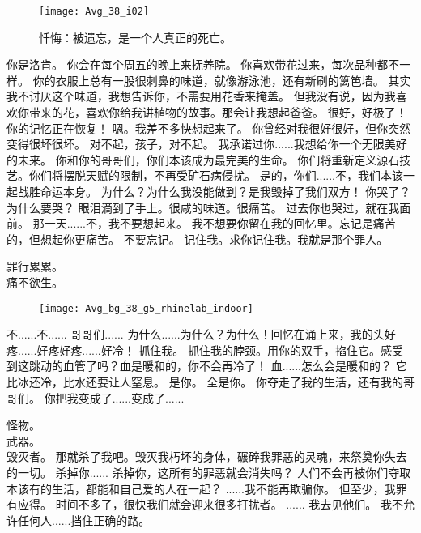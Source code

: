 \documentclass[openany]{book}
\begin{document}
\begin{figure}[h]
    \caption*{忏悔：被遗忘，是一个人真正的死亡。}
    \centering
    \texttt{[image: Avg\_38\_i02]}
\end{figure}
\begin{dialogue}
     你是洛肯。
     你会在每个周五的晚上来抚养院。
     你喜欢带花过来，每次品种都不一样。
     你的衣服上总有一股很刺鼻的味道，就像游泳池，还有新刷的篱笆墙。
     其实我不讨厌这个味道，我想告诉你，不需要用花香来掩盖。
     但我没有说，因为我喜欢你带来的花，喜欢你给我讲植物的故事。那会让我想起爸爸。
     很好，好极了！你的记忆正在恢复！
     嗯。我差不多快想起来了。
     你曾经对我很好很好，但你突然变得很坏很坏。
     对不起，孩子，对不起。
     我承诺过你......我想给你一个无限美好的未来。
     你和你的哥哥们，你们本该成为最完美的生命。
     你们将重新定义源石技艺。你们将摆脱天赋的限制，不再受矿石病侵扰。
     是的，你们......不，我们本该一起战胜命运本身。
     为什么？为什么我没能做到？是我毁掉了我们双方！
     你哭了？为什么要哭？
     眼泪滴到了手上。很咸的味道。很痛苦。
     过去你也哭过，就在我面前。
     那一天......不，我不要想起来。
     我不想要你留在我的回忆里。忘记是痛苦的，但想起你更痛苦。
     不要忘记。
     记住我。求你记住我。我就是那个罪人。\par
    罪行累累。\\
    痛不欲生。
    \begin{figure}[h]
        \centering
        \texttt{[image: Avg\_bg\_38\_g5\_rhinelab\_indoor]}
    \end{figure}
     不......不......
     哥哥们......
     为什么......为什么？为什么！回忆在涌上来，我的头好疼......好疼好疼......好冷！
     抓住我。
     抓住我的脖颈。用你的双手，掐住它。感受到这跳动的血管了吗？血是暖和的，你不会再冷了！
     血......怎么会是暖和的？
     它比冰还冷，比水还要让人窒息。
     是你。
     全是你。
     你夺走了我的生活，还有我的哥哥们。
     你把我变成了......变成了......\par
    怪物。\\
    武器。\\
    毁灭者。
     那就杀了我吧。毁灭我朽坏的身体，碾碎我罪恶的灵魂，来祭奠你失去的一切。
     杀掉你......
     杀掉你，这所有的罪恶就会消失吗？
     人们不会再被你们夺取本该有的生活，都能和自己爱的人在一起？
     ......我不能再欺骗你。
     但至少，我罪有应得。
     时间不多了，很快我们就会迎来很多打扰者。
     ......
     我去见他们。
     我不允许任何人......挡住正确的路。
\end{dialogue}
\end{document}
